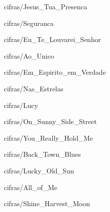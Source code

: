 \documentclass{scrartcl}
\begin{document}

{cifras/Jesus_Tua_Presenca}


{cifras/Seguranca}


{cifras/Eu_Te_Louvarei_Senhor}


{cifras/Ao_Unico}


{cifras/Em_Espirito_em_Verdade}


{cifras/Nas_Estrelas}


{cifras/Lucy}


{cifras/On_Sunny_Side_Street}


{cifras/You_Really_Hold_Me}


{cifras/Back_Town_Blues}


{cifras/Lucky_Old_Sun}


{cifras/All_of_Me}


{cifras/Shine_Harvest_Moon}

% 

% 
\end{document}
